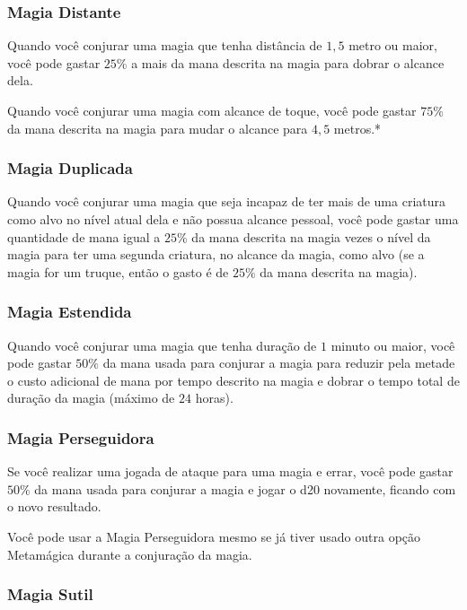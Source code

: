 \documentclass{RPG_Adventure}[2021/10/20]
\begin{document}
\subsubsection*{Magia Distante}%

Quando você conjurar uma magia que tenha distância de $1,5$ metro ou maior, você
pode gastar $25\%$ a mais da mana descrita na magia para dobrar o alcance dela.

Quando você conjurar uma magia com alcance de toque, você pode gastar $75\%$ da
mana descrita na magia para mudar o alcance para $4,5$ metros.*

\subsubsection*{Magia Duplicada}%

Quando você conjurar uma magia que seja incapaz de ter mais de uma criatura como
alvo no nível atual dela e não possua alcance pessoal, você pode gastar uma
quantidade de mana igual a $25\%$ da mana descrita na magia vezes o nível da
magia para ter uma segunda criatura, no alcance da magia, como alvo (se a magia
for um truque, então o gasto é de $25\%$ da mana descrita na magia).

\subsubsection{Magia Estendida}%

Quando você conjurar uma magia que tenha duração de $1$ minuto ou maior, você
pode gastar $50\%$ da mana usada para conjurar a magia para reduzir pela metade o
custo adicional de mana por tempo descrito na magia e dobrar o tempo total de
duração da magia (máximo de $24$ horas).

\subsubsection*{Magia Perseguidora}%

Se você realizar uma jogada de ataque para uma magia e errar, você pode gastar
$50\%$ da mana usada para conjurar a magia e jogar o d20 novamente, ficando com
o novo resultado.

Você pode usar a Magia Perseguidora mesmo se já tiver usado outra opção
Metamágica durante a conjuração da magia.

\subsubsection*{Magia Sutil}%
\end{document}
